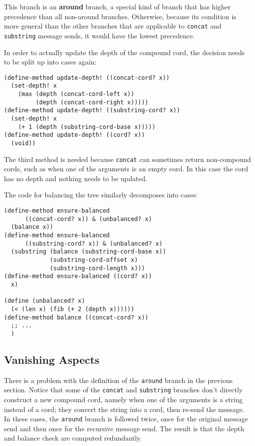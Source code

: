 \documentclass{acm_proc_article-sp}
\newcommand{\defn}[1]{\textbf{#1}}
\newcommand{\code}[1]{\texttt{#1}}
\begin{document}
This branch is an \defn{around} branch, a special kind of branch that has
higher precedence than all non-around branches.  Otherwise, because
its condition is more general than the other branches that are
applicable to \code{concat} and \code{substring} message sends, it would
have the lowest precedence.

In order to actually update the depth of the compound cord, the
decision needs to be split up into cases again:

\begin{verbatim}
(define-method update-depth! ((concat-cord? x))
  (set-depth! x
    (max (depth (concat-cord-left x))
         (depth (concat-cord-right x)))))
(define-method update-depth! ((substring-cord? x))
  (set-depth! x
    (+ 1 (depth (substring-cord-base x)))))
(define-method update-depth! ((cord? x))
  (void))
\end{verbatim}

The third method is needed because \code{concat} can sometimes return
non-compound cords, such as when one of the arguments is an empty cord.
In this case the cord has no depth and nothing needs to be updated.

The code for balancing the tree similarly decomposes into cases:

\begin{verbatim}
(define-method ensure-balanced
      ((concat-cord? x)) & (unbalanced? x)
  (balance x))
(define-method ensure-balanced
      ((substring-cord? x)) & (unbalanced? x)
  (substring (balance (substring-cord-base x))
             (substring-cord-offset x)
             (substring-cord-length x)))
(define-method ensure-balanced ((cord? x))
  x)

(define (unbalanced? x)
  (< (len x) (fib (+ 2 (depth x))))))
(define-method balance ((concat-cord? x))
  ;; ...
  )
\end{verbatim}

\subsection{Vanishing Aspects}

There is a problem with the definition of the \code{around} branch in
the previous section.  Notice that some of the \code{concat} and
\code{substring} branches don't directly construct a new compound
cord, namely when one of the arguments is a string instead of a cord;
they convert the string into a cord, then re-send the message.  In
these cases, the \code{around} branch is followed twice, once for the
original message send and then once for the recursive message send.
The result is that the depth and balance check are computed
redundantly.
\end{document}
